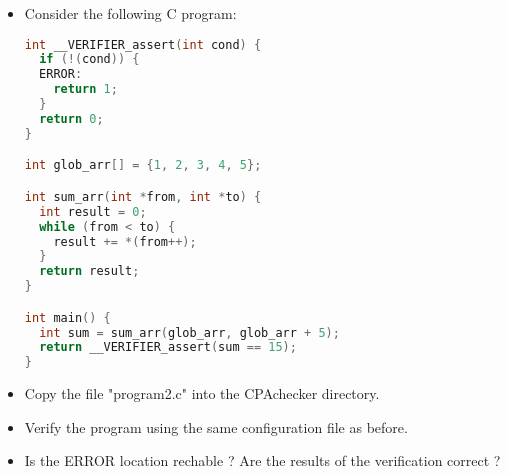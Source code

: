 \documentclass[language=en,sheet=5,prefix]{exercise}
\begin{document}

\task[Program 2]
\begin{itemize}
\item Consider the following C program:
\begin{lstlisting}[language=C]
int __VERIFIER_assert(int cond) {
  if (!(cond)) {
  ERROR:
    return 1;
  }
  return 0;
}

int glob_arr[] = {1, 2, 3, 4, 5};

int sum_arr(int *from, int *to) {
  int result = 0;
  while (from < to) {
    result += *(from++);
  }
  return result;
}

int main() {
  int sum = sum_arr(glob_arr, glob_arr + 5);
  return __VERIFIER_assert(sum == 15);
}
\end{lstlisting}
\item Copy the file "program2.c" into the CPAchecker directory.
\item Verify the program using the same configuration file as before.
\item Is the ERROR location rechable ? Are the results of the verification correct ?  
\end{itemize}
\end{document}
